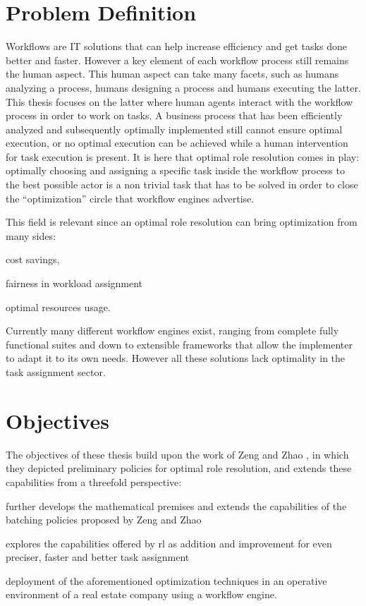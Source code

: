 \documentclass{seal_thesis}
\begin{document}
\section{Problem Definition}

Workflows are IT solutions that can help increase efficiency and get tasks done better and faster. However a key element of each workflow process still remains the human aspect. This human aspect can take many facets, such as humans analyzing a process, humans designing a process and humans executing the latter. This thesis focuses on the latter \ie where human agents interact with the workflow process in order to work on tasks. A business process that has been efficiently analyzed and subsequently optimally implemented still cannot ensure optimal execution, or no optimal execution can be achieved while a human intervention for task execution is present. It is here that optimal role resolution comes in play: optimally choosing and assigning a specific task inside the workflow process to the best possible actor is a non trivial task that has to be solved in order to close the ``optimization'' circle that workflow engines advertise.

This field is relevant since an optimal role resolution can bring optimization from many sides:
\begin{enumerate*}
	\item cost savings,
	\item fairness in workload assignment
	\item optimal resources usage.
\end{enumerate*}

Currently many different workflow engines exist, ranging from complete fully functional suites and down to extensible frameworks that allow the implementer to adapt it to its own needs. However all these solutions lack optimality in the task assignment sector.

\section{Objectives}
\label{sec:objectives}

The objectives of these thesis build upon the work of Zeng and Zhao \cite{Zeng2005}, in which they depicted preliminary policies for optimal role resolution, and extends these capabilities from a threefold perspective:
\begin{enumerate*}
	\item further develops the mathematical premises and extends the capabilities of the batching policies proposed by Zeng and Zhao
	\item explores the capabilities offered by \gls{rl} as addition and improvement for even preciser, faster and better task assignment
	\item deployment of the aforementioned optimization techniques in an operative environment of a real estate company using a workflow engine.
\end{enumerate*}
\end{document}
